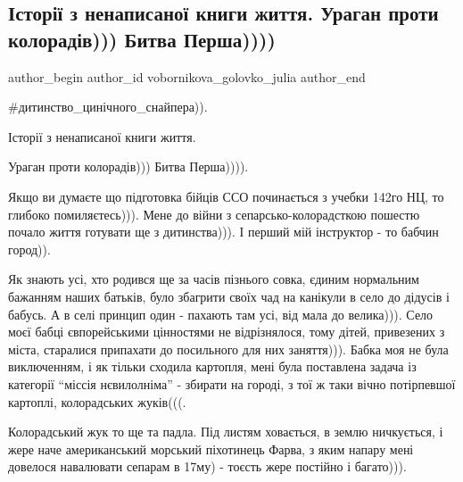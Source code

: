  
 
 
 
 

\subsection{Історії з ненаписаної книги життя. Ураган проти колорадів))) Битва Перша))))}
\label{sec:14_08_2023.fb.vobornikova_golovko_julia.1.uragan_proty_koloradiv_bytva_persha}

\ifcmt
 author_begin
   author_id vobornikova_golovko_julia
 author_end
\fi

\#дитинство\_цинічного\_снайпера)).

Історії з ненаписаної книги життя.

Ураган проти колорадів))) Битва Перша)))).

Якщо ви думаєте що підготовка бійців ССО починається з учебки 142го НЦ, то
глибоко помиляєтесь))). Мене до  війни з сепарсько-колорадсткою пошестю почало
життя готувати ще з дитинства))). І перший мій інструктор - то бабчин город)).

Як знають усі, хто родився ще за часів пізнього совка, єдиним нормальним
бажанням наших батьків, було збагрити своїх чад на канікули в село до дідусів і
бабусь. А в селі принцип один - пахають там усі, від мала до велика))). Село
моєї бабці євпорейськими цінностями не відрізнялося, тому дітей, привезених з
міста, старалися припахати до посильного для них заняття))). Бабка моя не була
виключенням, і як тільки сходила картопля, мені була поставлена задача із
категорії \enquote{міссія нєвилолніма} - збирати на городі, з тої ж таки вічно
потірпевшої картоплі, колорадських жуків(((.

Колорадський жук то ще та падла. Під листям ховається, в землю ничкується, і
жере наче американський морський піхотинець Фарва, з яким напару мені довелося
навалювати сепарам в 17му) - тоєсть жере постійно і багато))). 

